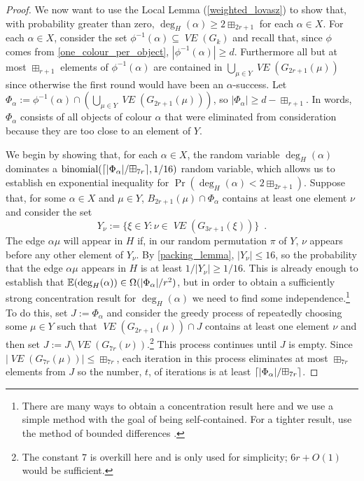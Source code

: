 \documentclass{patmorin}
\newcommand{\vol}[1]{\boxplus_{#1}}
\DeclareMathOperator{\binomial}{binomial}
\DeclareMathOperator{\VE}{\mathit{VE}}
\begin{document}
\begin{proof}
  We now want to use the Local Lemma (\cref{weighted_lovasz}) to show that, with probability greater than zero, $\deg_H(\alpha)\ge 2\vol{2r+1}$ for each $\alpha\in X$.  For each $\alpha\in X$, consider the set $\phi^{-1}(\alpha)\subseteq \VE(G_k)$ and recall that, since $\phi$ comes from \cref{one_colour_per_object}, $|\phi^{-1}(\alpha)| \ge d$.  Furthermore all but at most $\vol{r+1}$ elements of $\phi^{-1}(\alpha)$ are contained in $\bigcup_{\mu\in Y}\VE(G_{2r+1}(\mu))$ since otherwise the first round would have been an $\alpha$-success.  Let $\Phi_\alpha:=\phi^{-1}(\alpha)\cap \left(\bigcup_{\mu\in Y}\VE(G_{2r+1}(\mu))\right)$, so $|\Phi_\alpha|\ge d-\vol{r+1}$.  In words, $\Phi_\alpha$ consists of all objects of colour $\alpha$ that were eliminated from consideration because they are too close to an element of $Y$.



  We begin by showing that, for each $\alpha\in X$, the random variable $\deg_H(\alpha)$ dominates a $\binomial(\ceil{|\Phi_\alpha|/\vol{7r}},1/16)$ random variable, which allows us to establish en exponential inequality for $\Pr(\deg_H(\alpha) < 2\vol{2r+1})$. Suppose that, for some $\alpha\in X$ and $\mu\in Y$, $B_{2r+1}(\mu)\cap \Phi_\alpha$ contains at least one element $\nu$ and consider the set
  \[
     Y_\nu := \{\xi\in Y:\nu\in\VE(G_{3r+1}(\xi))\} \enspace .
  \]
  The edge $\alpha\mu$ will appear in $H$ if, in our random permutation $\pi$ of $Y$, $\nu$ appears before any other element of $Y_\nu$.  By \cref{packing_lemma}, $|Y_\nu|\le 16$, so the probability that the edge $\alpha\mu$ appears in $H$ is at least $1/|Y_\nu|\ge 1/16$. This is already enough to establish that $\mathbb{E}(\deg_H(\alpha)) \in \Omega(|\Phi_\alpha|/r^2)$, but in order to obtain a sufficiently strong concentration result for $\deg_H(\alpha)$ we need to find some independence.\footnote{There are many ways to obtain a concentration result here and we use a simple method with the goal of being self-contained.  For a tighter result, use the method of bounded differences \cite{mcdiarmid:on}.}  To do this, set $J:=\Phi_\alpha$ and consider the greedy process of repeatedly choosing some $\mu\in Y$ such that $\VE(G_{2r+1}(\mu))\cap J$ contains at least one element $\nu$ and then set $J:=J\setminus \VE(G_{7r}(\nu))$.\footnote{The constant $7$ is overkill here and is only used for simplicity; $6r+O(1)$ would be sufficient.}  This process continues until $J$ is empty. Since $|\VE(G_{7r}(\mu))|\le \vol{7r}$, each iteration in this process eliminates at most $\vol{7r}$ elements from $J$ so the number, $t$, of iterations is at least $\ceil{|\Phi_\alpha|/\vol{7r}}$.


\end{proof}
\end{document}
